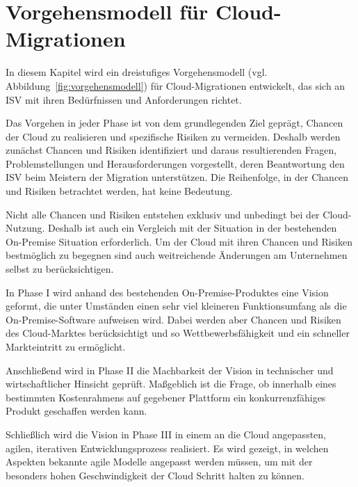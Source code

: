\section{Vorgehensmodell für Cloud-Migrationen}
\label{cha:entwicklung_vorgehensmodell}
In diesem Kapitel wird ein dreistufiges Vorgehensmodell (vgl. 
Abbildung~\ref{fig:vorgehensmodell}) für Cloud-Migrationen entwickelt, das sich 
an ISV mit ihren Bedürfnissen und Anforderungen 
richtet.

Das Vorgehen in jeder Phase ist von dem grundlegenden Ziel geprägt, Chancen der 
Cloud zu realisieren und spezifische Risiken zu vermeiden. Deshalb werden 
zunächst Chancen und Risiken identifiziert und daraus resultierenden 
Fragen, Problemstellungen und Herausforderungen vorgestellt, deren 
Beantwortung den ISV beim Meistern der Migration unterstützen. Die 
Reihenfolge, in der Chancen und Risiken betrachtet werden, hat keine 
Bedeutung. 

Nicht alle Chancen und Risiken entstehen exklusiv und unbedingt 
bei der Cloud-Nutzung. Deshalb ist auch ein Vergleich mit der Situation in der 
bestehenden On-Premise Situation erforderlich. Um der Cloud mit ihren Chancen 
und Risiken bestmöglich zu begegnen sind auch weitreichende Änderungen am 
Unternehmen selbst zu berücksichtigen.

In Phase I wird anhand des bestehenden On-Premise-Produktes eine Vision 
geformt, die unter Umständen einen sehr viel kleineren Funktionsumfang als die 
On-Premise-Software aufweisen wird. Dabei werden aber Chancen und Risiken des 
Cloud-Marktes berücksichtigt und so Wettbewerbsfähigkeit und ein schneller 
Markteintritt zu ermöglicht. 

Anschließend wird in Phase II die Machbarkeit der Vision in technischer und 
wirtschaftlicher Hinsicht geprüft. Maßgeblich ist die Frage, ob innerhalb 
eines bestimmten Kostenrahmens auf gegebener
Plattform ein konkurrenzfähiges Produkt geschaffen werden kann.

Schließlich wird die Vision in Phase III in einem an die Cloud 
angepassten, agilen, iterativen Entwicklungsprozess realisiert. Es wird 
gezeigt, in welchen Aspekten bekannte agile Modelle angepasst werden müssen, um 
mit der besonders hohen Geschwindigkeit der Cloud Schritt halten zu können. 

